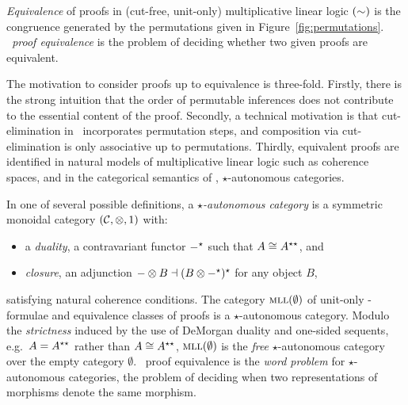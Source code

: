 \begin{definition}
\label{def:equivalence}
%
\emph{Equivalence} of proofs in (cut-free, unit-only) multiplicative linear logic $(\sim)$ is the congruence generated by the permutations given in Figure~\ref{fig:permutations}.
%
\emph{\MLL\ proof equivalence} is the problem of deciding whether two given proofs are equivalent.
%
\end{definition}



The motivation to consider proofs up to equivalence is three-fold.
%
Firstly, there is the strong intuition that the order of permutable inferences does not contribute to the essential content of the proof.
%
Secondly, a technical motivation is that cut-elimination in \MLL\ incorporates permutation steps, and composition via cut-elimination is only associative up to permutations.
%
Thirdly, equivalent proofs are identified in natural models of multiplicative linear logic such as coherence spaces, and in the categorical semantics of \MLL, $\star$-autonomous categories.



In one of several possible definitions, a \emph{$\star$-autonomous category} \citep{Barr-1979} is a symmetric monoidal category $(\mathcal C,\otimes,1)$ with:
%
\begin{itemize}
	
	\item
	a \emph{duality}, a contravariant functor $\dual-$ such that $A\cong\dual*A$, and

	\item
	\emph{closure}, an adjunction $-\tn B \dashv \dual{(B\tn\dual-)}$ for any object $B$,

\end{itemize}
%
satisfying natural coherence conditions.
%
The category $\textsc{mll}(\emptyset)$ of unit-only \MLL-formulae and equivalence classes of proofs is a $\star$-autonomous category.
%
Modulo the \emph{strictness} induced by the use of DeMorgan duality and one-sided sequents, e.g.\ $A=\dual*A$ rather than $A\cong\dual*A$, $\textsc{mll}(\emptyset)$ is the \emph{free} $\star$-autonomous category over the empty category $\emptyset$.
%
\MLL\ proof equivalence is the \emph{word problem} for $\star$-autonomous categories, the problem of deciding when two representations of morphisms denote the same morphism.



